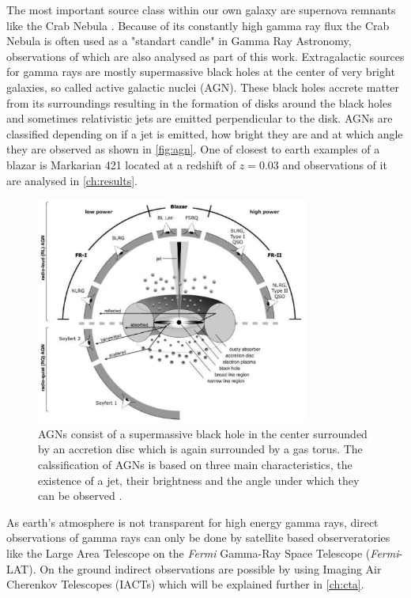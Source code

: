The most important source class within our own galaxy are supernova remnants like the Crab Nebula \cite{nuimeprn12618}. 
Because of its constantly high gamma ray flux the Crab Nebula is often used as a "standart candle" in Gamma Ray Astronomy, observations of which are also 
analysed as part of this work.
Extragalactic sources for gamma rays are mostly supermassive black holes at the center of very bright galaxies, so called active galactic nuclei (AGN).
These black holes accrete matter from its surroundings resulting in the formation of disks around the black holes and sometimes relativistic jets are emitted 
perpendicular to the disk.
AGNs are classified depending on if a jet is emitted, how bright they are and at which angle they are observed as shown in \autoref{fig:agn}.
One of closest to earth examples of a blazar is Markarian 421 located at a redshift of $z = \num{0.03}$ \cite{Albert_2007} and observations of it are analysed in 
\autoref{ch:results}.
\begin{figure}
    \centering
    \includegraphics[width=0.8\textwidth]{images/agn.png}
    \caption{AGNs consist of a supermassive black hole in the center surrounded by an accretion disc which is again surrounded by a gas torus.
        The calssification of AGNs is based on three main characteristics, the existence of a jet, their brightness and the angle under which they can be observed \cite{doi:10.1002/9783527666829.ch4}.
    }
    \label{fig:agn}
\end{figure}


As earth's atmosphere is not transparent for high energy gamma rays, direct observations of gamma rays can only be done by satellite based observeratories 
like the Large Area Telescope on the \textit{Fermi} Gamma-Ray Space Telescope (\textit{Fermi}-LAT).
On the ground indirect observations are possible by using Imaging Air Cherenkov Telescopes (IACTs) which will be explained further in \autoref{ch:cta}.
